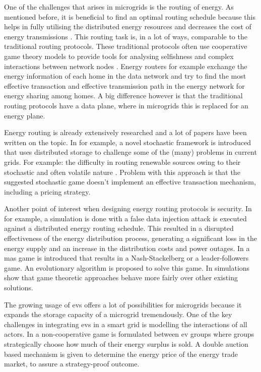 One of the challenges that arises in microgrids is the routing of energy. As mentioned before, it is beneficial to find an optimal routing schedule because this helps in fully utilising the distributed energy resources and decreases the cost of energy transmissions \cite{HongKim2016}. This routing task is, in a lot of ways, comparable to the traditional routing protocols. These traditional protocols often use cooperative game theory models to provide tools for analysing selfishness and complex interactions between network nodes \cite{PavlidouKoltsidas2008}. Energy routers for example exchange the energy information of each home in the data network and try to find the most effective transaction and effective transmission path in the energy network for energy sharing among homes. \cite{YoonKimChang2013} A big difference however is that the traditional routing protocols have a data plane, where in microgrids this is replaced for an energy plane.

Energy routing is already extensively researched and a lot of papers have been written on the topic. In \cite{BaghaieMoellerKrishnamachari2010} for example, a novel stochastic framework is introduced that uses distributed storage to challenge some of the (many) problems in current grids. For example: the difficulty in routing renewable sources owing to their stochastic and often volatile nature \cite{HongKim2016}. Problem with this approach is that the suggested stochastic game doesn't implement an effective transaction mechanism, including a pricing strategy. 

Another point of interest when designing energy routing protocols is security. In \cite{LinYuYangEtAl2012} for example, a simulation is done with a false data injection attack is executed against a distributed energy routing schedule. This resulted in a disrupted effectiveness of the energy distribution process, generating a significant loss in the energy supply and an increase in the distribution costs and power outages. In \cite{AhouraiTabandehJahedEtAl2009} a \ac{mas} game is introduced that results in a Nash-Stackelberg or a leader-followers game. An evolutionary algorithm is proposed to solve this game. In \cite{AhouraiTabandehJahedEtAl2009} simulations show that game theoretic approaches behave more fairly over other existing solutions.

The growing usage of \ac{ev}s offers a lot of possibilities for microgrids because it expands the storage capacity of a microgrid tremendously. One of the key challenges in integrating \ac{ev}s in a smart grid is modelling the interactions of all actors. In \cite{SaadHanPoorEtAl2011} a non-cooperative game is formulated between \ac{ev} groups where groups strategically choose how much of their energy surplus is sold. A double auction based mechanism is given to determine the energy price of the energy trade market, to assure a strategy-proof outcome. 

